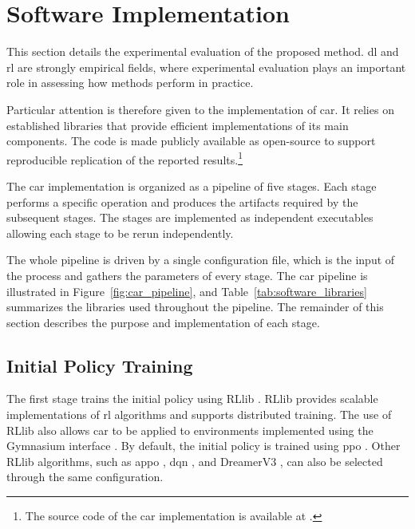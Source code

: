 \section{Software Implementation}
\label{sec:experiments_software_implementation}

This section details the experimental evaluation of the proposed method.
\gls{dl} and \gls{rl} are strongly empirical fields, where experimental evaluation plays an important role in assessing how methods perform in practice.

Particular attention is therefore given to the implementation of \gls{car}.
It relies on established libraries that provide efficient implementations of its main components.
The code is made publicly available as open-source to support reproducible replication of the reported results.\footnote{The source code of the \gls{car} implementation is available at \LinkCarRepository.}

The \gls{car} implementation is organized as a pipeline of five stages.
Each stage performs a specific operation and produces the artifacts required by the subsequent stages.
The stages are implemented as independent executables allowing each stage to be rerun independently.

The whole pipeline is driven by a single configuration file, which is the input of the process and gathers the parameters of every stage.
The \gls{car} pipeline is illustrated in Figure~\ref{fig:car_pipeline}, and Table~\ref{tab:software_libraries} summarizes the libraries used throughout the pipeline.
The remainder of this section describes the purpose and implementation of each stage.



\FloatBarrier



\subsection{Initial Policy Training}

The first stage trains the initial policy using RLlib \parencite{moritz2018ray, liang2018rllib}.
RLlib provides scalable implementations of \gls{rl} algorithms and supports distributed training.
The use of RLlib also allows \gls{car} to be applied to environments implemented using the Gymnasium interface \parencite{towers2024gymnasium}.
By default, the initial policy is trained using \gls{ppo} \parencite{schulman2017proximalpolicyoptimizationalgorithms}.
Other RLlib algorithms, such as \gls{appo} \parencite{espeholt2018impala}, \gls{dqn} \parencite{mnih2013playingatarideepreinforcement}, and DreamerV3 \parencite{hafner2023masteringdiversedomainsworld}, can also be selected through the same configuration.

